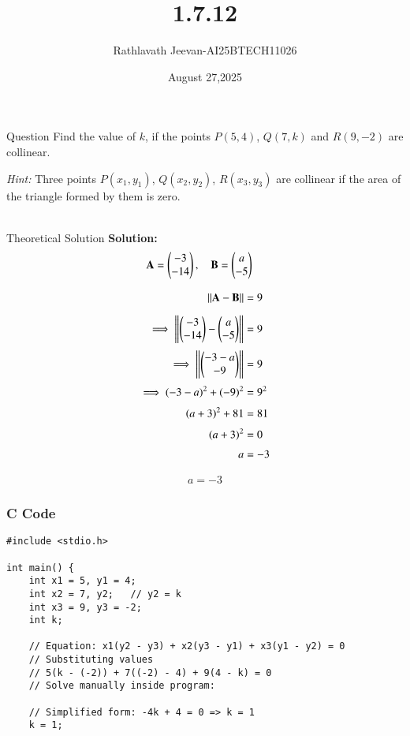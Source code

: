 \documentclass{beamer}
\title %
{1.7.12}
\date{August 27,2025}
\author %
{Rathlavath Jeevan-AI25BTECH11026}
\begin{document}
\frame{\titlepage}
\begin{frame}{Question}
\textbf{} Find the value of $k$, if the points $P(5,4)$, $Q(7,k)$ and $R(9,-2)$ are collinear. 

\textit{Hint:} Three points $P(x_1,y_1)$, $Q(x_2,y_2)$, $R(x_3,y_3)$ are collinear if the area of the triangle formed by them is zero.\\
\\
\end{frame}


\begin{frame}{Theoretical Solution}
\textbf{Solution:} \\
\begin{align}
\mathbf{A} &= \begin{pmatrix}-3\\-14\end{pmatrix}, \quad
\mathbf{B} = \begin{pmatrix}a\\-5\end{pmatrix}
\end{align}

\begin{align}
\|\mathbf{A}-\mathbf{B}\| &= 9 \\[2mm]
\implies \left\|\begin{pmatrix}-3\\-14\end{pmatrix} - \begin{pmatrix}a\\-5\end{pmatrix}\right\| &= 9 \\[1mm]
\implies \left\|\begin{pmatrix}-3-a\\-9\end{pmatrix}\right\| &= 9 \\[1mm]
\implies (-3-a)^2 + (-9)^2 &= 9^2 \\[1mm]
(a+3)^2 + 81 &= 81 \\[1mm]
(a+3)^2 &= 0 \\[1mm]
a &= -3
\end{align}

\begin{align}
\boxed{\,a = -3\,}
\end{align}

\end{frame}




\begin{frame}[fragile]
    \frametitle{C Code }

    \begin{lstlisting}
#include <stdio.h>

int main() {
    int x1 = 5, y1 = 4;
    int x2 = 7, y2;   // y2 = k
    int x3 = 9, y3 = -2;
    int k;

    // Equation: x1(y2 - y3) + x2(y3 - y1) + x3(y1 - y2) = 0
    // Substituting values
    // 5(k - (-2)) + 7((-2) - 4) + 9(4 - k) = 0
    // Solve manually inside program:

    // Simplified form: -4k + 4 = 0 => k = 1
    k = 1;
      \end{lstlisting}
\end{frame}
\end{document}
